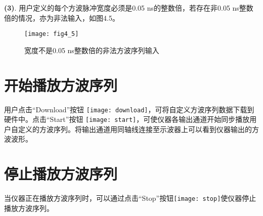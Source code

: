 \noindent \textbf{(3)}. 用户定义的每个方波脉冲宽度必须是0.05 ns的整数倍，若存在非0.05 ns整数倍的情况，亦为非法输入，如图4.5。
\begin{figure}[H]
\centering
\texttt{[image: fig4\_5]}
\caption{宽度不是0.05 ns整数倍的非法方波序列输入}
\end{figure}

\section{\heiti 开始播放方波序列}
用户点击“Download”按钮
\texttt{[image: download]}，可将自定义方波序列数据下载到硬件中。点击“Start”按钮
\texttt{[image: start]}，可使仪器各输出通道开始同步播放用户自定义的方波序列。将输出通道用同轴线连接至示波器上可以看到仪器输出的方波波形。

\section{\heiti 停止播放方波序列}
当仪器正在播放方波序列时，可以通过点击“Stop”按钮\texttt{[image: stop]}使仪器停止播放方波序列。





